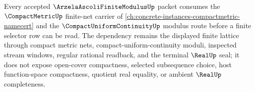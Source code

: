 \begin{lemma}
\label{lem:arzela-ascoli-finite-modulus-compactmetric-forward-lattice}
Every accepted $\ArzelaAscoliFiniteModulusUp$ packet consumes the $\CompactMetricUp$ finite-net carrier of \autoref{ch:concrete-instances-compactmetric-namecert} and the $\CompactUniformContinuityUp$ modulus route before a finite selector row can be read. The dependency remains the displayed finite lattice through compact metric nets, compact-uniform-continuity moduli, inspected stream windows, regular rational readback, and the terminal $\RealUp$ seal; it does not expose open-cover compactness, selected subsequence choice, host function-space compactness, quotient real equality, or ambient $\RealUp$ completeness.
\end{lemma}
